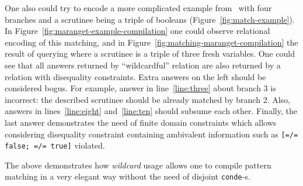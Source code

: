 One also could try to encode a more complicated example from~\cite{maranget2001} with four branches and a scrutinee being a triple of booleans (Figure~\ref{fig:match-example}).
In Figure~\ref{fig:maranget-example-compilation} one could observe relational encoding of this matching, 
and in Figure~\ref{fig:matching-maranget-compilation} the result of querying where a scrutinee is a triple of three fresh variables.
One could see that all answers returned by ``wildcardful'' relation are also returned by a relation with disequality constraints.
Extra answers on the left should be considered bogus.
For example, answer in line~\ref{line:three} about branch 3 is incorrect: the described scrutinee should be already matched by branch 2.
Also, answers in lines~\ref{line:eight} and~\ref{line:ten} should subsume each other.
Finally, the last answer demonstrates the need of finite domain constraints which allows considering disequality constraint containing ambivalent information such as \lstinline{[=/= false; =/= true]} violated.

The above demonstrates how \emph{wildcard} usage allows one to compile pattern matching in a very elegant way without the need of disjoint \lstinline{conde}-s.